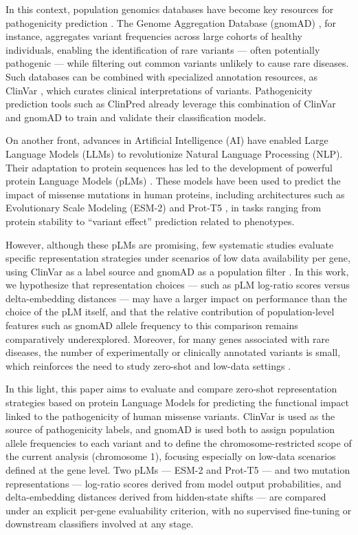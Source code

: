 \documentclass[12pt]{article}
\begin{document}
In this context, population genomics databases have become key resources for pathogenicity prediction \cite{sharo}. The Genome Aggregation Database (gnomAD) \cite{gnomad}, for instance, aggregates variant frequencies across large cohorts of healthy individuals, enabling the identification of rare variants --- often potentially pathogenic --- while filtering out common variants unlikely to cause rare diseases. Such databases can be combined with specialized annotation resources, as ClinVar \cite{clinvar}, which curates clinical interpretations of variants. Pathogenicity prediction tools such as ClinPred \cite{alirezaie} already leverage this combination of ClinVar and gnomAD to train and validate their classification models.

On another front, advances in Artificial Intelligence (AI) have enabled Large Language Models (LLMs) to revolutionize Natural Language Processing (NLP). Their adaptation to protein sequences has led to the development of powerful protein Language Models (pLMs) \cite{prottrans}. These models have been used to predict the impact of missense mutations in human proteins, including architectures such as Evolutionary Scale Modeling (ESM-2) \cite{esm2} and Prot-T5 \cite{prottrans}, in tasks ranging from protein stability to ``variant effect'' prediction related to phenotypes.

However, although these pLMs are promising, few systematic studies evaluate specific representation strategies under scenarios of low data availability per gene, using ClinVar as a label source and gnomAD as a population filter \cite{stein}. In this work, we hypothesize that representation choices — such as pLM log-ratio scores versus delta-embedding distances — may have a larger impact on performance than the choice of the pLM itself, and that the relative contribution of population-level features such as gnomAD allele frequency to this comparison remains comparatively underexplored. Moreover, for many genes associated with rare diseases, the number of experimentally or clinically annotated variants is small, which reinforces the need to study zero-shot and low-data settings \cite{sharo}.

In this light, this paper aims to evaluate and compare zero-shot representation strategies based on protein Language Models for predicting the functional impact linked to the pathogenicity of human missense variants. ClinVar is used as the source of pathogenicity labels, and gnomAD is used both to assign population allele frequencies to each variant and to define the chromosome-restricted scope of the current analysis (chromosome 1), focusing especially on low-data scenarios defined at the gene level. Two pLMs --- ESM-2 and Prot-T5 --- and two mutation representations --- log-ratio scores derived from model output probabilities, and delta-embedding distances derived from hidden-state shifts --- are compared under an explicit per-gene evaluability criterion, with no supervised fine-tuning or downstream classifiers involved at any stage.
\end{document}
